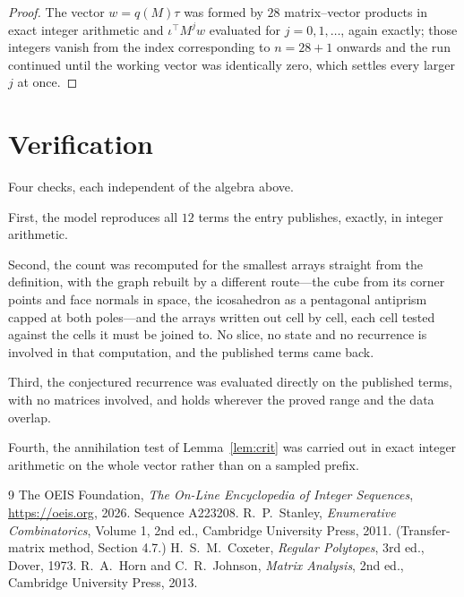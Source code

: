 \documentclass[11pt,a4paper]{article}
\theoremstyle{plain}
\theoremstyle{definition}
\begin{document}
\begin{proof}
The vector $w=q(M)\tau$ was formed by $28$ matrix--vector products in exact integer
arithmetic and $\iota^{\!\top}M^{j}w$ evaluated for $j=0,1,\dots$, again exactly; those
integers vanish from the index corresponding to $n=28+1$ onwards and the run continued
until the working vector was identically zero, which settles every larger $j$ at once.
\end{proof}

\section{Verification}

Four checks, each independent of the algebra above.

First, the model reproduces all $12$ terms the entry publishes, exactly, in integer
arithmetic.

Second, the count was recomputed for the smallest arrays straight from the definition, with the
graph rebuilt by a different route---the cube from its corner points and face normals in space,
the icosahedron as a pentagonal antiprism capped at both poles---and the arrays written out cell
by cell, each cell tested against the cells it must be joined to. No slice, no state and no
recurrence is involved in that computation, and the published terms came back.

Third, the conjectured recurrence was evaluated directly on the published terms, with no
matrices involved, and holds wherever the proved range and the data overlap.

Fourth, the annihilation test of Lemma~\ref{lem:crit} was carried out in exact integer
arithmetic on the whole vector rather than on a sampled prefix.

\begin{thebibliography}{9}
 The OEIS Foundation, \emph{The On-Line Encyclopedia of Integer
Sequences}, \url{https://oeis.org}, 2026. Sequence A223208.
 R.~P.~Stanley, \emph{Enumerative Combinatorics}, Volume 1, 2nd ed.,
Cambridge University Press, 2011. (Transfer-matrix method, Section 4.7.)
 H.~S.~M.~Coxeter, \emph{Regular Polytopes}, 3rd ed., Dover, 1973.
 R.~A.~Horn and C.~R.~Johnson, \emph{Matrix Analysis}, 2nd ed., Cambridge
University Press, 2013.
\end{thebibliography}
\end{document}
